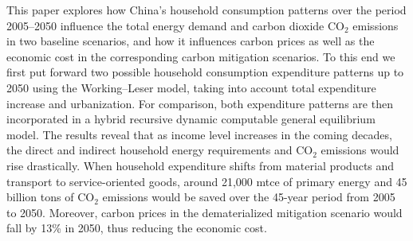 This paper explores how China’s household consumption patterns over the period 2005–2050 influence the total energy demand and carbon dioxide CO$_2$ emissions in two baseline scenarios, and how it influences carbon prices as well as the economic cost in the corresponding carbon mitigation scenarios. To this end we first put forward two possible household consumption expenditure patterns up to 2050 using the Working–Leser model, taking into account total expenditure increase and urbanization. For comparison, both expenditure patterns are then incorporated in a hybrid recursive dynamic computable general equilibrium model. The results reveal that as income level increases in the coming decades, the direct and indirect household energy requirements and CO$_2$ emissions would rise drastically. When household expenditure shifts from material products and transport to service-oriented goods, around 21,000 mtce of primary energy and 45 billion tons of CO$_2$ emissions would be saved over the 45-year period from 2005 to 2050. Moreover, carbon prices in the dematerialized mitigation scenario would fall by 13\% in 2050, thus reducing the economic cost.

